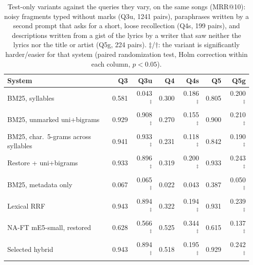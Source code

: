 \begin{table}[t]
\centering
\caption{Test-only variants against the queries they vary, on the same songs (MRR@10): noisy fragments typed
without marks (Q3u, 1241 pairs), paraphrases written by a second prompt that asks for a short, loose
recollection (Q4s, 199 pairs), and descriptions written from a gist of the lyrics by a writer that
saw neither the lyrics nor the title or artist (Q5g, 224 pairs). $\ddagger$/$\dagger$: the variant
is significantly harder/easier for that system (paired randomization test, Holm correction within each column,
$p<0.05$).}
\label{tab:variants}
\footnotesize
\setlength{\tabcolsep}{4pt}
\begin{tabular}{@{}l rr rr rr@{}}
\toprule
System & Q3 & Q3u & Q4 & Q4s & Q5 & Q5g \\
\midrule
BM25, syllables & 0.581 & 0.043$^{\ddagger}$ & 0.300 & 0.186$^{\ddagger}$ & 0.805 & 0.200$^{\ddagger}$ \\
BM25, unmarked uni+bigrams & 0.929 & 0.908$^{\ddagger}$ & 0.270 & 0.155$^{\ddagger}$ & 0.900 & 0.210$^{\ddagger}$ \\
BM25, char.\ 5-grams across syllables & 0.941 & 0.933$^{\ddagger}$ & 0.231 & 0.118$^{\ddagger}$ & 0.842 & 0.190$^{\ddagger}$ \\
Restore + uni+bigrams & 0.933 & 0.896$^{\ddagger}$ & 0.319 & 0.200$^{\ddagger}$ & 0.933 & 0.243$^{\ddagger}$ \\
BM25, metadata only & 0.067 & 0.065$^{\ddagger}$ & 0.022 & 0.043 & 0.387 & 0.050$^{\ddagger}$ \\
Lexical RRF & 0.943 & 0.894$^{\ddagger}$ & 0.322 & 0.194$^{\ddagger}$ & 0.931 & 0.239$^{\ddagger}$ \\
NA-FT mE5-small, restored & 0.628 & 0.566$^{\ddagger}$ & 0.525 & 0.344$^{\ddagger}$ & 0.615 & 0.137$^{\ddagger}$ \\
Selected hybrid & 0.943 & 0.894$^{\ddagger}$ & 0.518 & 0.195$^{\ddagger}$ & 0.929 & 0.242$^{\ddagger}$ \\
\bottomrule
\end{tabular}
\end{table}
